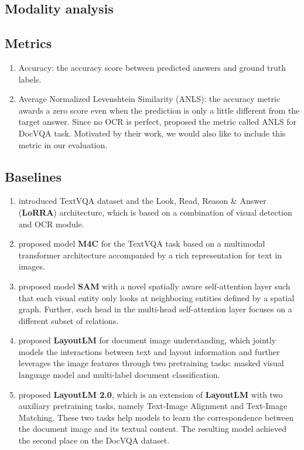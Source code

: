 \documentclass[11pt,a4paper]{article}
\begin{document}
\subsection{Modality analysis}


  

\subsection{Metrics}
\begin{enumerate}
    \item Accuracy: the accuracy score between predicted answers and ground truth labels.
    \item Average Normalized Levenshtein Similarity (ANLS): the accuracy metric awards a zero score even when the prediction is only a little different from the target answer. Since no OCR is perfect, \citet{mathew2021docvqa} proposed the metric called ANLS for DocVQA task. Motivated by their work, we would also like to include this metric in our evaluation.
    
\end{enumerate}

\subsection{Baselines}
\begin{enumerate}
	\item \citet{Singh_2019_CVPR} introduced TextVQA dataset and the Look, Read, Reason \& Answer (\textbf{LoRRA}) architecture, which is based on a combination of visual detection and OCR module.
	\item \citet{hu2020iterative} proposed model \textbf{M4C} for the TextVQA task based on a multimodal transformer architecture accompanied by a rich representation for text in images.
	\item \citet{kant2020spatially} proposed model \textbf{SAM} with a novel spatially aware self-attention layer such that each visual entity only looks at neighboring entities defined by a spatial graph. Further, each head in the multi-head self-attention layer focuses on a different subset of relations.
	\item \citet{xu2020layoutlm} proposed \textbf{LayoutLM} for document image understanding, which jointly models the interactions between text and layout information and further leverages the image features through two pretraining tasks: masked visual language model and multi-label document classification.
	\item \citet{xu2021layoutlmv2} proposed \textbf{LayoutLM 2.0}, which is an extension of \textbf{LayoutLM} with two auxiliary pretraining tasks, namely Text-Image Alignment and Text-Image Matching. These two tasks help models to learn the correspondence between the document image and its textual content. The resulting model achieved the second place on the DocVQA dataset.
\end{enumerate}
\end{document}
